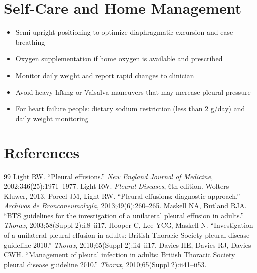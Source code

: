 \section*{Self-Care and Home Management}
\begin{itemize}
  \item Semi-upright positioning to optimize diaphragmatic excursion and ease breathing
  \item Oxygen supplementation if home oxygen is available and prescribed
  \item Monitor daily weight and report rapid changes to clinician
  \item Avoid heavy lifting or Valsalva maneuvers that may increase pleural pressure
  \item For heart failure people: dietary sodium restriction (less than 2 g/day) and daily weight monitoring
\end{itemize}

\section*{References}
\begin{thebibliography}{99}
 Light RW. ``Pleural effusions.'' \textit{New England Journal of Medicine}, 2002;346(25):1971--1977.
 Light RW. \textit{Pleural Diseases}, 6th edition. Wolters Kluwer, 2013.
 Porcel JM, Light RW. ``Pleural effusions: diagnostic approach.'' \textit{Archivos de Bronconeumolog\'ia}, 2013;49(6):260--265.
 Maskell NA, Butland RJA. ``BTS guidelines for the investigation of a unilateral pleural effusion in adults.'' \textit{Thorax}, 2003;58(Suppl 2):ii8--ii17.
 Hooper C, Lee YCG, Maskell N. ``Investigation of a unilateral pleural effusion in adults: British Thoracic Society pleural disease guideline 2010.'' \textit{Thorax}, 2010;65(Suppl 2):ii4--ii17.
 Davies HE, Davies RJ, Davies CWH. ``Management of pleural infection in adults: British Thoracic Society pleural disease guideline 2010.'' \textit{Thorax}, 2010;65(Suppl 2):ii41--ii53.

\end{thebibliography}
